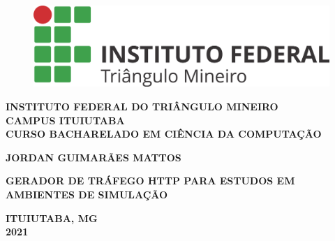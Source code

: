 \thispagestyle{empty}

\begin{figure}
	\centering
	\includegraphics[scale=0.3]{pre-textuais/Horizontal_resumida.png}
\end{figure}

\begin{center}
\textbf{INSTITUTO FEDERAL DO TRIÂNGULO MINEIRO\\ CAMPUS ITUIUTABA\\CURSO BACHARELADO EM CIÊNCIA DA COMPUTAÇÃO}\\

\vspace*{3 cm}

\textbf{JORDAN GUIMARÃES MATTOS}\\

\vspace*{5 cm}

\textbf{\large{GERADOR DE TRÁFEGO HTTP PARA ESTUDOS EM AMBIENTES DE SIMULAÇÃO}}

\vspace*{8 cm}

\textbf{ITUIUTABA, MG\\2021}
\end{center}